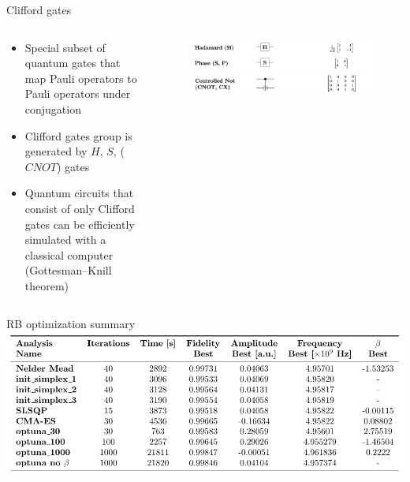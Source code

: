 \documentclass[aspectratio=169,10pt]{beamer}
\begin{document}
\begin{frame}{Clifford gates}
  \begin{columns}
    \begin{column}{0.4\textwidth}
      \begin{itemize}[label=\textbullet]
        \item Special subset of quantum gates that map Pauli operators to Pauli operators under conjugation
        \hspace{10mm}
        \item Clifford gates group is generated by $H$, $S$, ($CNOT$) gates
        \hspace{10mm}
        \item Quantum circuits that consist of only Clifford gates can be efficiently simulated with a classical computer (Gottesman–Knill theorem)
      \end{itemize}
    \end{column}
    \begin{column}{0.6\textwidth}
      \begin{figure}
        \centering
        \includegraphics[width=\textwidth]{figures/HS.png}
        \includegraphics[width=\textwidth]{figures/CNOT.png}
        \vfill
      \end{figure}
    \end{column}
  \end{columns}
\end{frame}

\begin{frame}{RB optimization summary}
  \centering
  \includegraphics[width=\textwidth]{figures/recap_table.pdf}
\end{frame}
\end{document}
